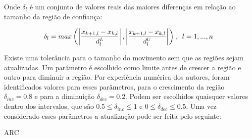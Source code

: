 Onde \(\delta_l\) é um conjunto de valores reais das maiores diferenças em relação ao
tamanho da região de confiança:

\begin{equation}
  \delta_l = max \left ( \left | \frac{x_{k+1, l} - x_{k, l}}{d^L_l} \right |, \left | \frac{x_{k+1, l} - x_{k, l}}{d^U_l} \right | \right ), \hspace{0.2cm} l = 1, ..., n
\end{equation}

Existe uma tolerância para o tamanho do movimento sem que as regiões sejam atualizadas.
Um parâmetro é escolhido como limite antes de crescer a região e outro para diminuir a
região. Por experiência numérica dos autores, foram identificados valores para esses
parâmetros, para o crescimento da região \(\delta_{inc} = 0.8\) e para a diminuição
\(\delta_{dec} = 0.2\). Podem ser escolhidos quaisquer valores dentro dos intervalos,
que são \(0.5 \leq \delta_{inc} \leq 1\) e \(0 \leq \delta_{dec} \leq 0.5\). Uma
vez considerado esses parâmetros a atualização pode ser feita pelo seguinte:

\vspace{15pt}
\begin{algorithm}[H]
  \SetAlgoLined
  \caption{ARC}
\end{algorithm}
\vspace{15pt}

